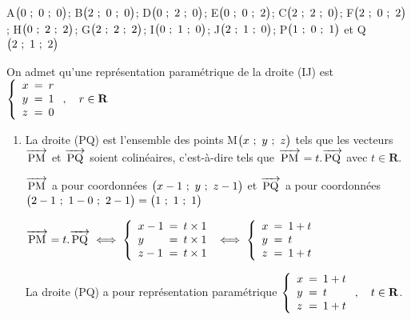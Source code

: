 \documentclass[10pt,a4paper]{article}
\newcommand{\R}{\textbf{R}}
\newcommand{\vectt}[1]{\overrightarrow{\,\mathstrut\text{#1}\,}}%
\begin{document}
\hfill{}A$\left( 0~;~0~;~0\strut\right )$; B$\left( 2~;~0~;~0\strut\right )$; D$\left( 0~;~2~;~0\strut\right )$; E$\left( 0~;~0~;~2\strut\right )$;
C$\left( 2~;~2~;~0\strut\right )$; F$\left( 2~;~0~;~2\strut\right )$; H$\left( 0~;~2~;~2\strut\right )$; G$\left( 2~;~2~;~2\strut\right )$;
I$\left( 0~;~1~;~0\strut\right )$; J$\left( 2~;~1~;~0\strut\right )$; P$\left( 1~;~0~;~1\strut\right )$ et Q$\left( 2~;~1~;~2\strut\right )$\hfill{}

\smallskip

On admet qu'une représentation paramétrique de la droite (IJ) est
$\left \lbrace
\begin{array}{l !{=} l}
x& r\\
y & 1\\
z & 0\\
\end{array}
\right . , \quad r\in\R$

\begin{enumerate}
\item%
%
La droite (PQ) est l'ensemble des points M$\left( x~;~y~;~z\strut\right )$ tels que les vecteurs $\vectt{PM}$ et $\vectt{PQ}$ soient colinéaires, c'est-à-dire tels que $\vectt{PM} = t.\vectt{PQ}$ avec $t\in\R$.

$\vectt{PM}$ a pour coordonnées $\left( x-1~;~y~;~z-1\strut\right )$ et $\vectt{PQ}$ a pour coordonnées $\left( 2-1~;~1-0~;~2-1\strut\right )=\left( 1~;~1~;~1\strut\right )$

$\vectt{PM} = t.\vectt{PQ}
\iff
\left \lbrace
\begin{array}{l !{=} l}
x-1& t\times 1\\
y & t\times 1 \\
z-1 & t\times 1\\
\end{array}
\right .
\iff
\left \lbrace
\begin{array}{l !{=} l}
x& 1+ t\\
y & t \\
z & 1+t\\
\end{array}
\right .$

La droite (PQ) a pour représentation paramétrique
$\left \lbrace
\begin{array}{l !{=} l}
x& 1+t\\
y & t \\
z & 1+t\\
\end{array}
\right . ,\quad t\in\R$.

\end{enumerate}
\end{document}
